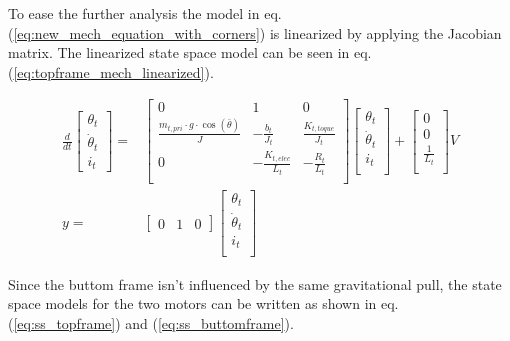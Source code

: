 \documentclass[../../main]{subfiles}
\begin{document}

To ease the further analysis the model in eq. (\ref{eq:new_mech_equation_with_corners}) is linearized by applying the Jacobian matrix. The linearized state space model can be seen in eq. (\ref{eq:topframe_mech_linearized}).

\begin{equation}
      \label{eq:topframe_mech_linearized}
      \begin{split}
      \frac{d}{dt}
    \begin{bmatrix}
        \theta_t \\
        \dot \theta_t \\
        i_t
    \end{bmatrix}
    =&
    \begin{bmatrix}
        0 & 1               & 0             \\
        \frac{m_{t,pri} \cdot g \cdot \cos(\bar \theta)}{J} & -\frac{b_t}{J_t}    & \frac{K_{t,toque}}{J_t} \\
        0 & -\frac{K_{t,elec}}{L_t}  & -\frac{R_t}{L_t}  \\
    \end{bmatrix}
    \begin{bmatrix}
        \theta_t \\
        \dot \theta_t \\
        i_t \\
    \end{bmatrix}
    +
    \begin{bmatrix}
        0 \\
        0 \\
        \frac{1}{L_t} \\
    \end{bmatrix}
    V
\\
      y =&
    \begin{bmatrix}
        0 & 1 & 0
    \end{bmatrix}
    \begin{bmatrix}
        \theta_t \\
        \dot \theta_t\\
        i_t\\
    \end{bmatrix}
    \end{split}
\end{equation}

Since the buttom frame isn't influenced by the same gravitational pull, the state space models for the two motors can be written as shown in eq. (\ref{eq:ss_topframe}) and (\ref{eq:ss_buttomframe}).
\end{document}
